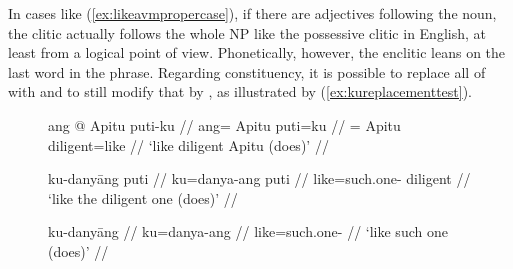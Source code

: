 In cases like (\ref{ex:likeavmpropercase}), if there are adjectives following
the noun, the clitic actually follows the whole NP like the  possessive
clitic in English, at least from a logical point of view. Phonetically,
however, the enclitic leans on the last word in the phrase. Regarding
constituency, it is possible to replace all of  with  and to still modify that by
, as illustrated by (\ref{ex:kureplacementtest}).

\begin{figure}
\pex\label{ex:kureplacementtest}
\a\label{ex:kureplacementtest1}\begingl
	\gla ang @ Apitu puti-ku //
	\glb ang= Apitu puti=ku //
	\glc \Aarg{}= Apitu diligent=like //
	\glft `like diligent Apitu (does)' //
\endgl

\a\label{ex:kureplacementtest2}\begingl
	\gla ku-danyāng puti //
	\glb ku=danya-ang puti //
	\glc like=such.one-\Aarg{} diligent //
	\glft `like the diligent one (does)' //
\endgl

\a\label{ex:kureplacementtest3}\begingl
	\gla ku-danyāng //
	\glb ku=danya-ang //
	\glc like=such.one-\Aarg{} //
	\glft `like such one (does)' //
\endgl

\xe
\end{figure}


